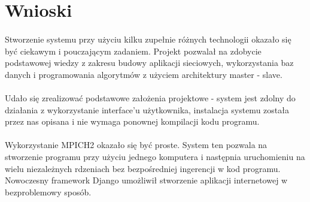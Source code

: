 \documentclass{article}
\begin{document}
\section{Wnioski}
\paragraph{}Stworzenie systemu przy użyciu kilku zupełnie różnych technologii okazało się być ciekawym i pouczającym zadaniem. Projekt pozwalał na zdobycie podstawowej wiedzy z zakresu budowy aplikacji sieciowych, wykorzystania baz danych i programowania algorytmów z użyciem architektury master - slave. 
\paragraph{}Udało się zrealizować podstawowe założenia projektowe - system jest zdolny do działania z wykorzystanie interface'u użytkownika, instalacja systemu została przez nas opisana i nie wymaga ponownej kompilacji kodu programu.
\paragraph{}Wykorzystanie MPICH2 okazało się być proste. System ten pozwala na stworzenie programu przy użyciu jednego komputera i następnia uruchomieniu na wielu niezależnych rdzeniach bez bezpośredniej ingerencji w kod programu. Nowoczesny framework Django umożliwił stworzenie aplikacji internetowej w bezproblemowy sposób.
\end{document}
